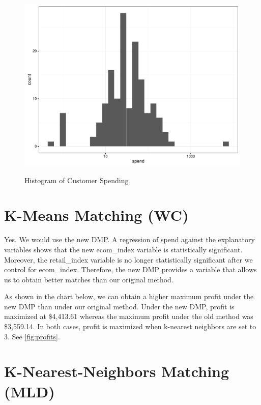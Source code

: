 \begin{figure}[!htb]
  \centering
  \caption{Histogram of Customer Spending}
  \includegraphics[scale=.5]{cust_spend_hist.pdf}
  \label{fig:cust_spend_hist}
\end{figure}


\section{K-Means Matching (WC)}

Yes. We would use the new DMP. A regression of spend against the explanatory variables shows that the new ecom\_index variable is statistically significant. Moreover, the retail\_index variable is no longer statistically significant after we control for ecom\_index. Therefore, the new DMP provides a variable that allows us to obtain better matches than our original method.

As shown in the chart below, we can obtain a higher maximum profit under the new DMP than under our original method. Under the new DMP, profit is maximized at \$4,413.61 whereas the maximum profit under the old method was \$3,559.14. In both cases, profit is maximized when k-nearest neighbors are set to 3. See \vref{fig:profits}.

\section{K-Nearest-Neighbors Matching (MLD)}

